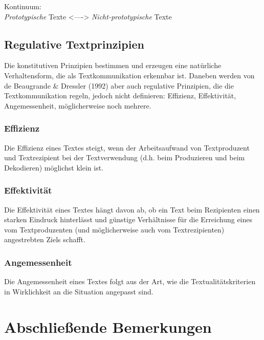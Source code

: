 \documentclass[
  letterpaper,
  DIV=11,
  numbers=noendperiod]{scrreprt}
\begin{document}
Kontinuum:\\
\emph{Prototypische} Texte \textless----\textgreater{}
\emph{Nicht-prototypische} Texte

\hypertarget{regulative-textprinzipien}{%
\section{Regulative Textprinzipien}\label{regulative-textprinzipien}}

Die konstitutiven Prinzipien bestimmen und erzeugen eine natürliche
Verhaltensform, die als Textkommunikation erkennbar ist. Daneben werden
von de Beaugrande \& Dressler (1992) aber auch regulative Prinzipien,
die die Textkommunikation regeln, jedoch nicht definieren: Effizienz,
Effektivität, Angemessenheit, möglicherweise noch mehrere.

\hypertarget{effizienz}{%
\subsection{Effizienz}\label{effizienz}}

Die Effizienz eines Textes steigt, wenn der Arbeitsaufwand von
Textproduzent und Textrezipient bei der Textverwendung (d.h. beim
Produzieren und beim Dekodieren) möglichst klein ist.

\hypertarget{effektivituxe4t}{%
\subsection{Effektivität}\label{effektivituxe4t}}

Die Effektivität eines Textes hängt davon ab, ob ein Text beim
Rezipienten einen starken Eindruck hinterlässt und günstige Verhältnisse
für die Erreichung eines vom Textproduzenten (und möglicherweise auch
vom Textrezipienten) angestrebten Ziels schafft.

\hypertarget{angemessenheit}{%
\subsection{Angemessenheit}\label{angemessenheit}}

Die Angemessenheit eines Textes folgt aus der Art, wie die
Textualitätskriterien in Wirklichkeit an die Situation angepasst sind.


\hypertarget{abschlieuxdfende-bemerkungen}{%
\chapter{Abschließende Bemerkungen}\label{abschlieuxdfende-bemerkungen}}
\end{document}
